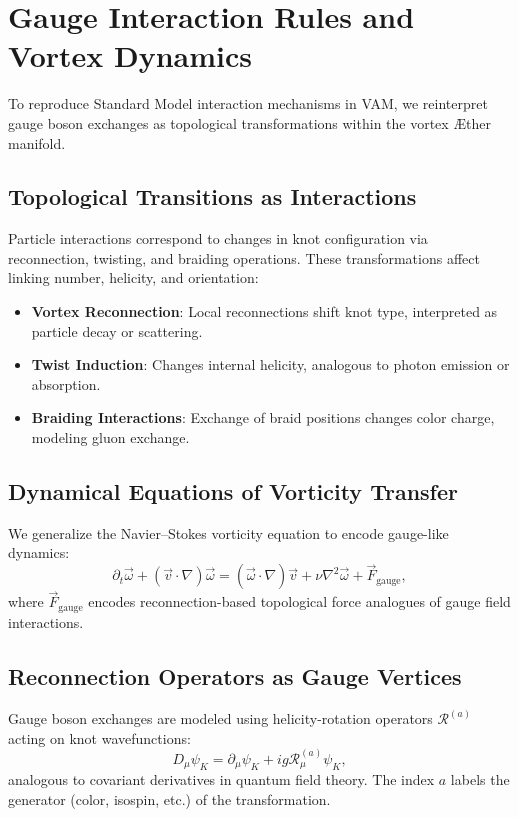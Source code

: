 \section{Gauge Interaction Rules and Vortex Dynamics}

To reproduce Standard Model interaction mechanisms in VAM, we reinterpret gauge boson exchanges as topological transformations within the vortex Æther manifold.

\subsection{Topological Transitions as Interactions}

Particle interactions correspond to changes in knot configuration via reconnection, twisting, and braiding operations. These transformations affect linking number, helicity, and orientation:

\begin{itemize}
    \item \textbf{Vortex Reconnection}: Local reconnections shift knot type, interpreted as particle decay or scattering.
    \item \textbf{Twist Induction}: Changes internal helicity, analogous to photon emission or absorption.
    \item \textbf{Braiding Interactions}: Exchange of braid positions changes color charge, modeling gluon exchange.
\end{itemize}

\subsection{Dynamical Equations of Vorticity Transfer}

We generalize the Navier–Stokes vorticity equation to encode gauge-like dynamics:
\begin{equation}
    \partial_t \vec{\omega} + (\vec{v} \cdot \nabla)\vec{\omega} = (\vec{\omega} \cdot \nabla)\vec{v} + \nu \nabla^2 \vec{\omega} + \vec{F}_{\text{gauge}},
\end{equation}
where $\vec{F}_{\text{gauge}}$ encodes reconnection-based topological force analogues of gauge field interactions.

\subsection{Reconnection Operators as Gauge Vertices}

Gauge boson exchanges are modeled using helicity-rotation operators $\mathcal{R}^{(a)}$ acting on knot wavefunctions:
\begin{equation}
    D_\mu \psi_K = \partial_\mu \psi_K + i g \mathcal{R}^{(a)}_\mu \psi_K,
\end{equation}
analogous to covariant derivatives in quantum field theory. The index $a$ labels the generator (color, isospin, etc.) of the transformation.

